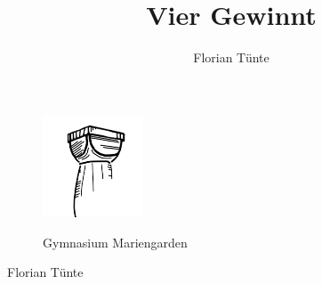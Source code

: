 \documentclass[12pt,a4paper]{article}
\title{Vier Gewinnt}
\author{Florian Tünte}
\begin{document}
	
	
	\begin{figure}[htbp]
		
		\begin{minipage}[t]{3cm}
			
			\vspace{0pt}
			
			\flushleft
			
			\includegraphics[width=3cm, height=3cm]{LogoGymnasiumMariengarden.png}
			
			\label{fig:LogoGymnasiumMariengarden}
			
		\end{minipage}
	
		
		\hfill
		
		\begin{minipage}[t]{6cm}
			
			\vspace{0pt}
			
			\flushleft
			
			{\Large Gymnasium Mariengarden}
			
		\end{minipage}
		
	\end{figure}



	
	\begin{flushright}
		
		\large{Florian Tünte}
		
	\end{flushright}
	
\end{document}
